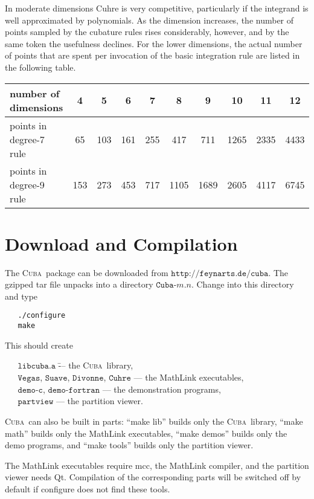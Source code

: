 \documentclass[12pt]{article}
\newcommand\cuba{\textsc{Cuba}}
\newcommand\Code[1]{\ensuremath{\texttt{#1}}}
\begin{document}
In moderate dimensions Cuhre is very competitive, particularly if the 
integrand is well approximated by polynomials.  As the dimension 
increases, the number of points sampled by the cubature rules rises 
considerably, however, and by the same token the usefulness declines.
For the lower dimensions, the actual number of points that are spent per 
invocation of the basic integration rule are listed in the following 
table.
\begin{center}
\begin{tabular}{l|ccccccccc}
number of dimensions &
	4 & 5 & 6 & 7 & 8 & 9 & 10 & 11 & 12 \\ \hline
points in degree-7 rule &
	65 & 103 & 161 & 255 & 417 & 711 & 1265 & 2335 & 4433 \\
points in degree-9 rule &
	153 & 273 & 453 & 717 & 1105 & 1689 & 2605 & 4117 & 6745
\end{tabular}
\end{center}


\section{Download and Compilation}

The \cuba\ package can be downloaded from
\Code{http://feynarts.de/cuba}.  The gzipped tar file unpacks into
a directory \Code{Cuba-$m$.$n$}.  Change into this directory and type
\begin{verbatim}
   ./configure
   make
\end{verbatim}
This should create
\begin{tabbing}
\verb=   =\Code{libcuba.a} \hspace{10em}
\= --- the \cuba\ library, \\
\verb=   =\Code{Vegas}, \Code{Suave}, \Code{Divonne}, \Code{Cuhre}
\> --- the MathLink executables, \\
\verb=   =\Code{demo-c}, \Code{demo-fortran}
\> --- the demonstration programs, \\
\verb=   =\Code{partview}
\> --- the partition viewer.
\end{tabbing}
\cuba\ can also be built in parts: ``make lib'' builds only the \cuba\
library, ``make math'' builds only the MathLink executables, ``make
demos'' builds only the demo programs, and ``make tools'' builds only 
the partition viewer.

The MathLink executables require mcc, the MathLink compiler, and the
partition viewer needs Qt.  Compilation of the corresponding parts will
be switched off by default if configure does not find these tools.
\end{document}
